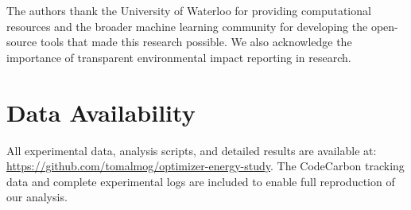 \documentclass[conference]{IEEEtran}
\begin{document}
The authors thank the University of Waterloo for providing computational resources and the broader machine learning community for developing the open-source tools that made this research possible. We also acknowledge the importance of transparent environmental impact reporting in research.

\section*{Data Availability}

All experimental data, analysis scripts, and detailed results are available at: \url{https://github.com/tomalmog/optimizer-energy-study}. The CodeCarbon tracking data and complete experimental logs are included to enable full reproduction of our analysis.

\balance


\end{document}
